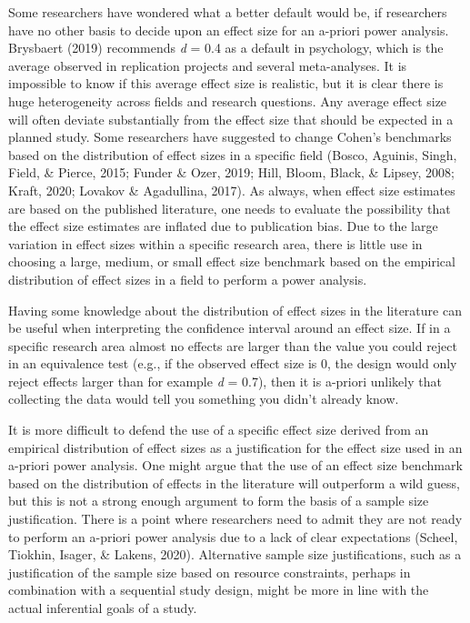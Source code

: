 \documentclass[
  english,
  ,jou, a4paper,floatsintext]{apa6}
\begin{document}
Some researchers have wondered what a better default would be, if researchers have no other basis to decide upon an effect size for an a-priori power analysis. Brysbaert (2019) recommends \emph{d} = 0.4 as a default in psychology, which is the average observed in replication projects and several meta-analyses. It is impossible to know if this average effect size is realistic, but it is clear there is huge heterogeneity across fields and research questions. Any average effect size will often deviate substantially from the effect size that should be expected in a planned study. Some researchers have suggested to change Cohen's benchmarks based on the distribution of effect sizes in a specific field (Bosco, Aguinis, Singh, Field, \& Pierce, 2015; Funder \& Ozer, 2019; Hill, Bloom, Black, \& Lipsey, 2008; Kraft, 2020; Lovakov \& Agadullina, 2017). As always, when effect size estimates are based on the published literature, one needs to evaluate the possibility that the effect size estimates are inflated due to publication bias. Due to the large variation in effect sizes within a specific research area, there is little use in choosing a large, medium, or small effect size benchmark based on the empirical distribution of effect sizes in a field to perform a power analysis.

Having some knowledge about the distribution of effect sizes in the literature can be useful when interpreting the confidence interval around an effect size. If in a specific research area almost no effects are larger than the value you could reject in an equivalence test (e.g., if the observed effect size is 0, the design would only reject effects larger than for example \emph{d} = 0.7), then it is a-priori unlikely that collecting the data would tell you something you didn't already know.

It is more difficult to defend the use of a specific effect size derived from an empirical distribution of effect sizes as a justification for the effect size used in an a-priori power analysis. One might argue that the use of an effect size benchmark based on the distribution of effects in the literature will outperform a wild guess, but this is not a strong enough argument to form the basis of a sample size justification. There is a point where researchers need to admit they are not ready to perform an a-priori power analysis due to a lack of clear expectations (Scheel, Tiokhin, Isager, \& Lakens, 2020). Alternative sample size justifications, such as a justification of the sample size based on resource constraints, perhaps in combination with a sequential study design, might be more in line with the actual inferential goals of a study.
\end{document}
